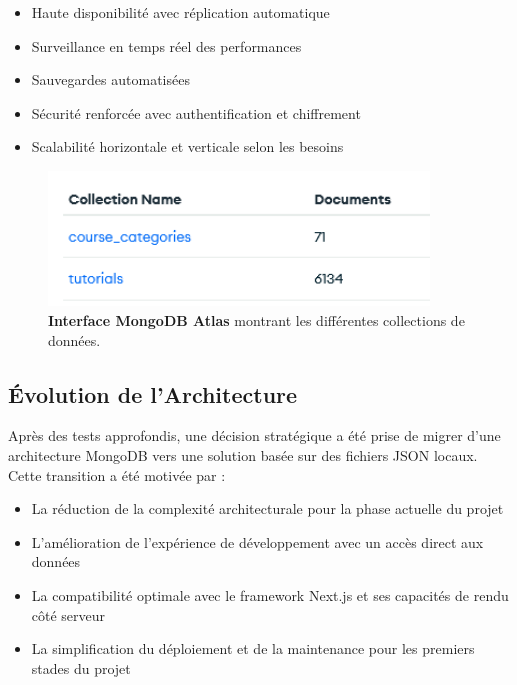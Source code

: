 \begin{itemize}
  \item Haute disponibilité avec réplication automatique
  \item Surveillance en temps réel des performances
  \item Sauvegardes automatisées
  \item Sécurité renforcée avec authentification et chiffrement
  \item Scalabilité horizontale et verticale selon les besoins
\end{itemize}

\begin{figure}[h!]
  \centering
  \includegraphics[width=0.9\textwidth,keepaspectratio]{week_3_img/Screenshot 2025-05-19 234047.png}
  \caption{\textbf{Interface MongoDB Atlas} montrant les différentes collections de données.}
  \label{fig:mongodb_collections}
\end{figure}

\subsection{Évolution de l'Architecture}

Après des tests approfondis, une décision stratégique a été prise de migrer d'une architecture MongoDB vers une solution basée sur des fichiers JSON locaux. Cette transition a été motivée par :

\begin{itemize}
  \item La réduction de la complexité architecturale pour la phase actuelle du projet
  \item L'amélioration de l'expérience de développement avec un accès direct aux données
  \item La compatibilité optimale avec le framework Next.js et ses capacités de rendu côté serveur
  \item La simplification du déploiement et de la maintenance pour les premiers stades du projet
\end{itemize}

